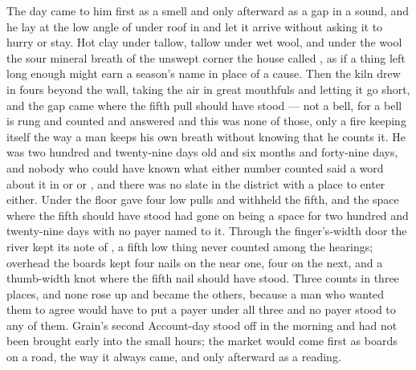 
The day came to him first as a smell and only afterward as a gap in a sound, and he lay at the low angle of  under  roof in  and let it arrive without asking it to hurry or stay. Hot clay under tallow, tallow under wet wool, and under the wool the sour mineral breath of the unswept corner the house called , as if a thing left long enough might earn a season's name in place of a cause. Then the kiln drew in fours beyond the wall, taking the air in great mouthfuls and letting it go short, and the gap came where the fifth pull should have stood --- not a bell, for a bell is rung and counted and answered and this was none of those, only a fire keeping itself the way a man keeps his own breath without knowing that he counts it. He was two hundred and twenty-nine days old and six months and forty-nine days, and nobody who could have known what either number counted said a word about it in  or  or , and there was no slate in the district with a place to enter either. Under the floor  gave four low pulls and withheld the fifth, and the space where the fifth should have stood had gone on being a space for two hundred and twenty-nine days with no payer named to it. Through the finger's-width door the river kept its note of , a fifth low thing never counted among the hearings; overhead the boards kept four nails on the near one, four on the next, and a thumb-width knot where the fifth nail should have stood. Three counts in three places, and none rose up and became the others, because a man who wanted them to agree would have to put a payer under all three and no payer stood to any of them. Grain's second Account-day stood off in the morning and had not been brought early into the small hours; the market would come first as boards on a road, the way it always came, and only afterward as a reading.

